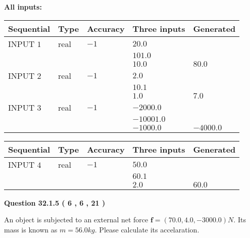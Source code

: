 \documentclass[12pt]{article}
\begin{document}
   
   
   
\noindent\vspace{0.1in}\hspace{-0.08in} {\textbf{\Large{All inputs: }}}
   
   
  
  
\noindent\begin{tabular}{|l|l|l|l|l|}
\hline
 Sequential & Type & Accuracy & Three inputs & Generated \\ 
\hline
 
 
  INPUT $            1 $ & real & $           -1  $ & $
 20.0
  $ & \\
  & & &  $
 101.0
  $ & \\
  & & &  $
 10.0
 $ & $ 80.0 $ 
 \\  \hline  
 
 
  INPUT $            2 $ & real & $           -1  $ & $
 2.0
  $ & \\
  & & &  $
 10.1
  $ & \\
  & & &  $
 1.0
 $ & $ 7.0 $ 
 \\  \hline  
 
 
  INPUT $            3 $ & real & $           -1  $ & $
 -2000.0
  $ & \\
  & & &  $
 -10001.0
  $ & \\
  & & &  $
 -1000.0
 $ & $ -4000.0 $ 
 \\  \hline  
 \end{tabular}
   
   
  
  
\noindent\begin{tabular}{|l|l|l|l|l|}
\hline
 Sequential & Type & Accuracy & Three inputs & Generated \\ 
\hline
 
 
  INPUT $            4 $ & real & $           -1  $ & $
 50.0
  $ & \\
  & & &  $
 60.1
  $ & \\
  & & &  $
 2.0
 $ & $ 60.0 $ 
 \\  \hline  
 \end{tabular}
   
   
  
\vspace{0.2in}
  
{\textbf{\Large{Question
32.1.5 
 (           6 ,           6 ,          21 )
}}}
  
  
 
An object is subjected to an external net force $\mathbf{f}=(
70.0,  %
4.0,
-3000.0  )N$. Its mass is known as
$m= %
56.0 kg$. Please calculate its accelaration.
 
\end{document}
